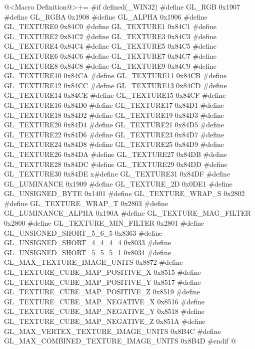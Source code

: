 \iniciocodigo
@<Macro Definition@>+=
#if defined(_WIN32)
#define GL_RGB                              0x1907
#define GL_RGBA                             0x1908
#define GL_ALPHA                            0x1906
#define GL_TEXTURE0                         0x84C0
#define GL_TEXTURE1                         0x84C1
#define GL_TEXTURE2                         0x84C2
#define GL_TEXTURE3                         0x84C3
#define GL_TEXTURE4                         0x84C4
#define GL_TEXTURE5                         0x84C5
#define GL_TEXTURE6                         0x84C6
#define GL_TEXTURE7                         0x84C7
#define GL_TEXTURE8                         0x84C8
#define GL_TEXTURE9                         0x84C9
#define GL_TEXTURE10                        0x84CA
#define GL_TEXTURE11                        0x84CB
#define GL_TEXTURE12                        0x84CC
#define GL_TEXTURE13                        0x84CD
#define GL_TEXTURE14                        0x84CE
#define GL_TEXTURE15                        0x84CF
#define GL_TEXTURE16                        0x84D0
#define GL_TEXTURE17                        0x84D1
#define GL_TEXTURE18                        0x84D2
#define GL_TEXTURE19                        0x84D3
#define GL_TEXTURE20                        0x84D4
#define GL_TEXTURE21                        0x84D5
#define GL_TEXTURE22                        0x84D6
#define GL_TEXTURE23                        0x84D7
#define GL_TEXTURE24                        0x84D8
#define GL_TEXTURE25                        0x84D9
#define GL_TEXTURE26                        0x84DA
#define GL_TEXTURE27                        0x84DB
#define GL_TEXTURE28                        0x84DC
#define GL_TEXTURE29                        0x84DD
#define GL_TEXTURE30                        0x84DE
x#define GL_TEXTURE31                        0x84DF
#define GL_LUMINANCE                        0x1909
#define GL_TEXTURE_2D                       0x0DE1
#define GL_UNSIGNED_BYTE                    0x1401
#define GL_TEXTURE_WRAP_S                   0x2802
#define GL_TEXTURE_WRAP_T                   0x2803
#define GL_LUMINANCE_ALPHA                  0x190A
#define GL_TEXTURE_MAG_FILTER               0x2800
#define GL_TEXTURE_MIN_FILTER               0x2801
#define GL_UNSIGNED_SHORT_5_6_5             0x8363
#define GL_UNSIGNED_SHORT_4_4_4_4           0x8033
#define GL_UNSIGNED_SHORT_5_5_5_1           0x8034
#define GL_MAX_TEXTURE_IMAGE_UNITS          0x8872
#define GL_TEXTURE_CUBE_MAP_POSITIVE_X      0x8515
#define GL_TEXTURE_CUBE_MAP_POSITIVE_Y      0x8517
#define GL_TEXTURE_CUBE_MAP_POSITIVE_Z      0x8519
#define GL_TEXTURE_CUBE_MAP_NEGATIVE_X      0x8516
#define GL_TEXTURE_CUBE_MAP_NEGATIVE_Y      0x8518
#define GL_TEXTURE_CUBE_MAP_NEGATIVE_Z      0x851A
#define GL_MAX_VERTEX_TEXTURE_IMAGE_UNITS   0x8B4C
#define GL_MAX_COMBINED_TEXTURE_IMAGE_UNITS 0x8B4D
#endif
@
\fimcodigo

